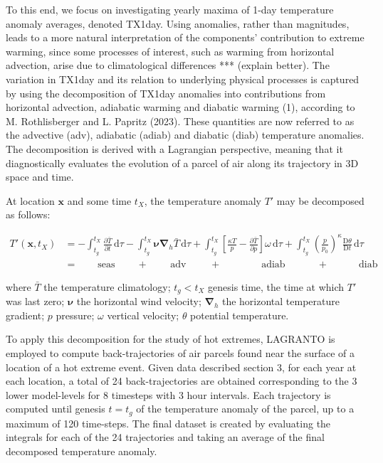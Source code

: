 \documentclass[11pt,a4paper,twoside,openright]{report}
\theoremstyle{definition}
\numberwithin{equation}{subsection}
\begin{document}
To this end, we focus on investigating yearly maxima of 1-day temperature anomaly averages, denoted TX1day. Using anomalies, rather than magnitudes, leads to a more natural interpretation of the components' contribution to extreme warming, since some processes of interest, such as warming from horizontal advection, arise due to climatological differences *** (explain better). The variation in TX1day and its relation to underlying physical processes is captured by using the decomposition of TX1day anomalies into contributions from horizontal advection, adiabatic warming and diabatic warming (1), according to M. Rothlisberger and L. Papritz (2023). These quantities are now referred to as the advective (adv), adiabatic (adiab) and diabatic (diab) temperature anomalies. The decomposition is derived with a Lagrangian perspective, meaning that it diagnostically evaluates the evolution of a parcel of air along its trajectory in 3D space and time.

At location \(\mathbf{x}\) and some time \(t_X\), the temperature anomaly \(T'\) may be decomposed as follows:

\begin{equation}
\label{eq:1}
 \begin{split}
   T'(\mathbf{x},t_X)  & = - \int_{t_g}^{t_X} \frac{\partial \bar{T}}{\partial t} \, \text{d}\tau - \int_{t_g}^{t_X} \mathbf{\nu} \mathbf{\nabla}_h \bar{T} \, \text{d}\tau + \int_{t_g}^{t_X} \left[ \frac{\kappa T}{p} - \frac{\partial \bar{T}}{\partial p}\right] \omega \, \text{d}\tau + \int_{t_g}^{t_X} \left( \frac{p}{p_0} \right)^\kappa \frac{\text{D}\theta}{\text{D}t} \, \text{d}\tau   \\
   & = \qquad \text{seas} \qquad \, + \, \quad \quad \text{adv} \qquad \, \, + \qquad \qquad \text{adiab} \qquad \quad \,  + \qquad \quad \text{diab} 
\end{split}
\end{equation}

where \(\bar{T}\) the temperature climatology; \(t_g < t_X\) genesis time, the time at which \(T'\) was last zero; \(\mathbf{\nu}\) the horizontal wind velocity; \(\mathbf{\nabla}_h\) the horizontal temperature gradient; \(p\) pressure; \(\omega\) vertical velocity; \(\theta\) potential temperature.

To apply this decomposition for the study of hot extremes, LAGRANTO is employed to compute back-trajectories of air parcels found near the surface of a location of a hot extreme event. Given data described section 3, for each year at each location, a total of 24 back-trajectories are obtained corresponding to the 3 lower model-levels for 8 timesteps with 3 hour intervals. Each trajectory is computed until genesis \(t=t_g\) of the temperature anomaly of the parcel, up to a maximum of 120 time-steps. The final dataset is created by evaluating the integrals for each of the 24 trajectories and taking an average of the final decomposed temperature anomaly.
\end{document}
